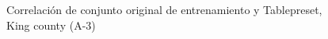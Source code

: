 \begin{figure}[H]
    \centering
    
    \caption{Correlación de conjunto original de entrenamiento y Tablepreset, King county (A-3)}
    \label{pairwise-king county-a-3-tablepreset}
\end{figure}